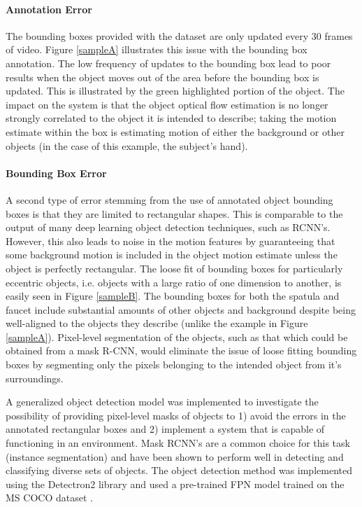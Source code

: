 \documentclass[12pt]{report}
\begin{document}
\paragraph{Annotation Error}
The bounding boxes provided with the dataset are only updated every 30 frames of video. Figure \ref{sampleA} illustrates this issue with the bounding box annotation. The low frequency of updates to the bounding box lead to poor results when the object moves out of the area before the bounding box is updated. This is illustrated by the green highlighted portion of the object. The impact on the system is that the object optical flow estimation is no longer strongly correlated to the object it is intended to describe; taking the motion estimate within the box is estimating motion of either the background or other objects (in the case of this example, the subject's hand).

\paragraph{Bounding Box Error}
A second type of error stemming from the use of annotated object bounding boxes is that they are limited to rectangular shapes. This is comparable to the output of many deep learning object detection techniques, such as RCNN's. However, this also leads to noise in the motion features by guaranteeing that some background motion is included in the object motion estimate unless the object is perfectly rectangular. The loose fit of bounding boxes for particularly eccentric objects, i.e. objects with a large ratio of one dimension to another, is easily seen in Figure \ref{sampleB}. The bounding boxes for both the spatula and faucet include substantial amounts of other objects and background despite being well-aligned to the objects they describe (unlike the example in Figure \ref{sampleA}). Pixel-level segmentation of the objects, such as that which could be obtained from a mask R-CNN, would eliminate the issue of loose fitting bounding boxes by segmenting only the pixels belonging to the intended object from it's surroundings.

A generalized object detection model was implemented to investigate the possibility of providing pixel-level masks of objects to 1) avoid the errors in the annotated rectangular boxes and 2) implement a system that is capable of functioning in an environment. Mask RCNN's are a common choice for this task (instance segmentation) and have been shown to perform well in detecting and classifying diverse sets of objects\cite{Cheng2020Panoptic-DeepLab:Segmentation, Chen2019Tensormask:Segmentation, Michaelis2018One-shotSegmentation}. The object detection method was implemented using the Detectron2 library and used a pre-trained FPN model trained on the MS COCO dataset \cite{wu2019detectron2}.
\end{document}
